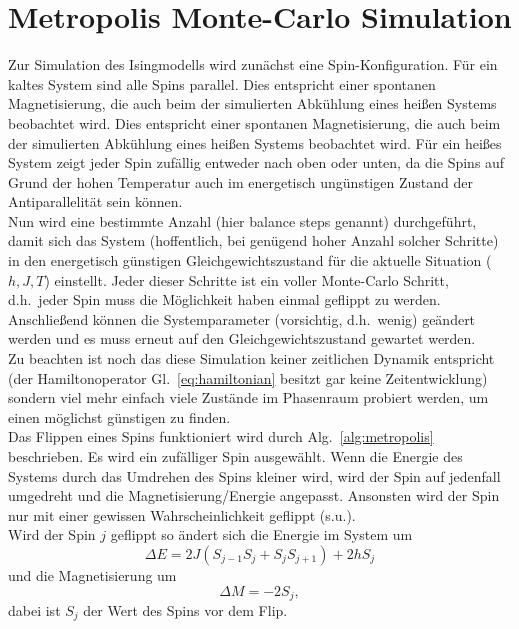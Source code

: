 		\section{Metropolis Monte-Carlo Simulation}
		Zur Simulation des Isingmodells wird zunächst eine Spin-Konfiguration. Für ein kaltes System sind alle Spins parallel. Dies entspricht einer spontanen Magnetisierung, die auch beim der simulierten Abkühlung eines heißen Systems beobachtet wird. Dies entspricht einer spontanen Magnetisierung, die auch beim der simulierten Abkühlung eines heißen Systems beobachtet wird. Für ein heißes System zeigt jeder Spin zufällig entweder nach oben oder unten, da die Spins auf Grund der hohen Temperatur auch im energetisch ungünstigen Zustand der Antiparallelität sein können. \\
		Nun wird eine bestimmte Anzahl (hier balance steps genannt) durchgeführt, damit sich das System (hoffentlich, bei genügend hoher Anzahl solcher Schritte) in den energetisch günstigen Gleichgewichtszustand für die aktuelle Situation ($h, J, T$) einstellt. Jeder dieser Schritte ist ein voller Monte-Carlo Schritt, d.h.\ jeder Spin muss die Möglichkeit haben einmal geflippt zu werden. Anschließend können die Systemparameter (vorsichtig, d.h.\ wenig) geändert werden und es muss erneut auf den Gleichgewichtszustand gewartet werden.\\
		Zu beachten ist noch das diese Simulation keiner zeitlichen Dynamik entspricht (der Hamiltonoperator Gl.~\eqref{eq:hamiltonian} besitzt gar keine Zeitentwicklung) sondern viel mehr einfach viele Zustände im Phasenraum probiert werden, um einen möglichst günstigen zu finden.\\
		Das Flippen eines Spins funktioniert wird durch Alg.~\ref{alg:metropolis} beschrieben. Es wird ein zufälliger Spin ausgewählt. Wenn die Energie des Systems durch das Umdrehen des Spins kleiner wird, wird der Spin auf jedenfall umgedreht und die Magnetisierung/Energie angepasst. Ansonsten wird der Spin nur mit einer gewissen Wahrscheinlichkeit geflippt (s.u.).\\
		Wird der Spin $j$ geflippt so ändert sich die Energie im System um
		\begin{equation*}
				\Delta E=2 J \left(S_{j-1}S_j+S_j S_{j+1}\right) + 2 h S_j
		\end{equation*}
		und die Magnetisierung um
		\begin{equation*}
				\Delta M = -2S_j,
		\end{equation*}
		dabei ist $S_j$ der Wert des Spins vor dem Flip. \\
